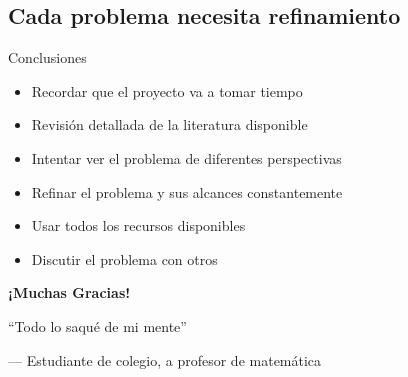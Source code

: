\documentclass[14pt]{beamer}
\begin{document}
    \subsection{Cada problema necesita refinamiento}
     

    
    
        \begin{frame}{Conclusiones}
        
            \begin{itemize}[<+-|alert@+>]
            
                \item
                Recordar que el proyecto va a tomar tiempo
                
                \item
                Revisión detallada de la literatura disponible
                
                \item
                Intentar ver el problema de diferentes perspectivas
                
                \item
                Refinar el problema y sus alcances constantemente
                
                \item
                Usar todos los recursos disponibles
                
                \item
                Discutir el problema con otros
               
            \end{itemize}

            
        \end{frame}

        
       \begin{frame}[plain]
        \begin{center}
            \Large{\textbf{¡Muchas Gracias!}}
        
        
            \epigraph{``Todo lo saqué de mi mente''}
            {--- Estudiante de colegio, a profesor de matemática}
        \end{center}
    \end{frame}
    
\end{document}
